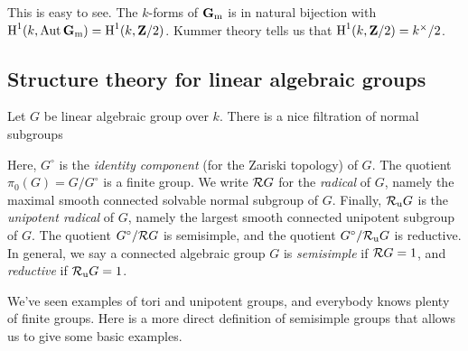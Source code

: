 \begin{hard}
This is easy to see. The $k$-forms of $\mathbf{G}_\mathrm{m}$ is in natural bijection with
$\operatorname{H}^1(k,\operatorname{Aut} \mathbf{G}_\mathrm{m})=\operatorname{H}^1(k,\mathbf{Z}/2)$. Kummer theory tells us that 
$\operatorname{H}^1(k,\mathbf{Z}/2)=k^\times/2$. 
\end{hard}





\subsection{Structure theory for linear algebraic groups}\label{sec:str-thry-lag}

Let $G$ be linear algebraic group over $k$. There is a nice filtration of normal 
subgroups 
\begin{center}
\end{center}

Here, $G^\circ$ is the \emph{identity component} (for the Zariski topology) of 
$G$. The quotient $\pi_0(G)=G/G^\circ$ is a finite group. We write 
$\mathcal{R} G$ for the \emph{radical} of $G$, namely the maximal smooth connected 
solvable normal subgroup of $G$. Finally, $\mathcal{R}_\mathrm{u} G$ is the \emph{unipotent 
radical} of $G$, namely the largest smooth connected unipotent subgroup of 
$G$. The quotient $G^\circ/\mathcal{R} G$ is semisimple, and the quotient 
$G^\circ/\mathcal{R}_\mathrm{u} G$ is reductive. In general, we say a connected algebraic 
group $G$ is \emph{semisimple} if $\mathcal{R} G=1$, and \emph{reductive} if 
$\mathcal{R}_\mathrm{u} G=1$. 

We've seen examples of tori and unipotent groups, and everybody knows plenty of 
finite groups. Here is a more direct definition of semisimple groups that 
allows us to give some basic examples. 

